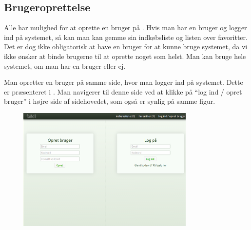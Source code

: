 \subsection{Brugeroprettelse}
\label{subsec:brug-opret}

Alle har mulighed for at oprette en bruger på \Foodl{}. Hvis man har en bruger og logger ind på systemet, så kan man kan gemme sin indkøbsliste og listen over favoritter. Det er dog ikke obligatorisk at have en bruger for at kunne bruge systemet, da vi ikke ønsker at binde brugerne til at oprette noget som helst. Man kan bruge hele systemet, om man har en bruger eller ej.

Man opretter en bruger på samme side, hvor man logger ind på systemet. Dette er præsenteret i . Man navigerer til denne side ved at klikke på ``log ind / opret bruger'' i højre side af sidehovedet, som også er synlig på samme figur.

\begin{figure}[H]
	\centering
	\includegraphics[scale=1]{billeder/foodl/thumbnails/opretbrugeroglogind.png}
	\label{fig:overblik-brugeroprettelse}
\end{figure}




